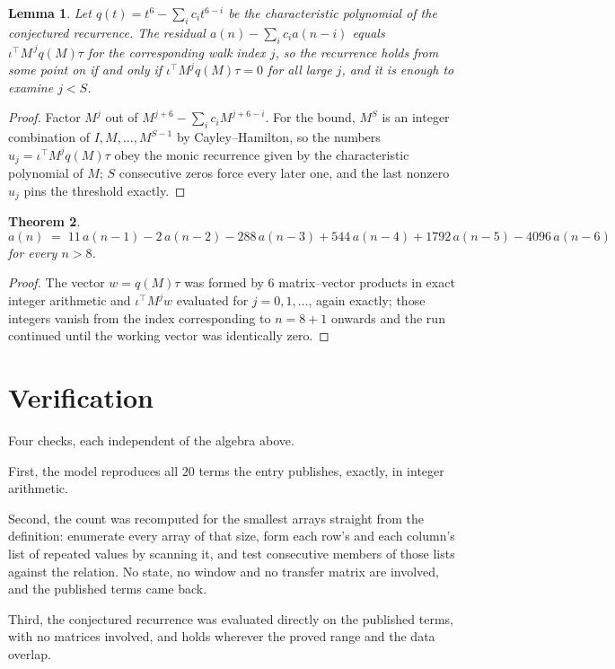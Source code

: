 \documentclass[11pt,a4paper]{article}
\theoremstyle{plain}
\newtheorem{theorem}{Theorem}
\newtheorem{lemma}[theorem]{Lemma}
\theoremstyle{definition}
\begin{document}
\begin{lemma}\label{lem:crit}
Let $q(t)=t^{6}-\sum_i c_it^{6-i}$ be the characteristic polynomial of the
conjectured recurrence. The residual $a(n)-\sum_ic_ia(n-i)$ equals
$\iota^{\!\top}M^{\,j}q(M)\tau$ for the corresponding walk index $j$, so the recurrence
holds from some point on if and only if $\iota^{\!\top}M^{j}q(M)\tau=0$ for all large $j$,
and it is enough to examine $j<S$.
\end{lemma}

\begin{proof}
Factor $M^{j}$ out of $M^{j+6}-\sum_ic_iM^{j+6-i}$. For the bound, $M^{S}$
is an integer combination of $I,M,\dots,M^{S-1}$ by Cayley--Hamilton, so the numbers
$u_j=\iota^{\!\top}M^{j}q(M)\tau$ obey the monic recurrence given by the characteristic
polynomial of $M$; $S$ consecutive zeros force every later one, and the last nonzero $u_j$
pins the threshold exactly.
\end{proof}

\begin{theorem}
\[
a(n)\;=\;11\,a(n-1) - 2\,a(n-2) - 288\,a(n-3) + 544\,a(n-4) + 1792\,a(n-5) - 4096\,a(n-6)
\]
for every $n>8$.
\end{theorem}

\begin{proof}
The vector $w=q(M)\tau$ was formed by $6$ matrix--vector products in exact integer
arithmetic and $\iota^{\!\top}M^{j}w$ evaluated for $j=0,1,\dots$, again exactly; those
integers vanish from the index corresponding to $n=8+1$ onwards and the run continued
until the working vector was identically zero.
\end{proof}

\section{Verification}

Four checks, each independent of the algebra above.

First, the model reproduces all $20$ terms the entry publishes, exactly, in integer
arithmetic.

Second, the count was recomputed for the smallest arrays straight from the definition:
enumerate every array of that size, form each row's and each column's list of repeated values
by scanning it, and test consecutive members of those lists against the relation. No state, no
window and no transfer matrix are involved, and the published terms came back.

Third, the conjectured recurrence was evaluated directly on the published terms, with no
matrices involved, and holds wherever the proved range and the data overlap.
\end{document}
